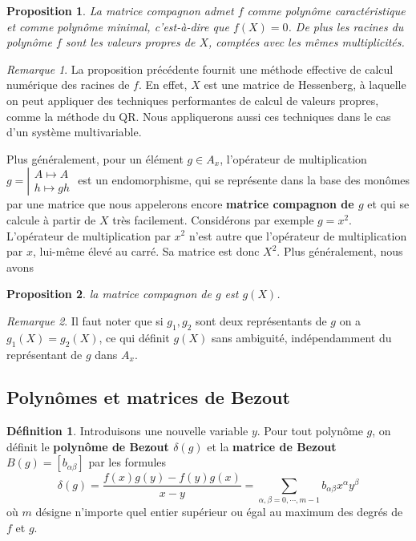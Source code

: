 \documentclass{article}
\theoremstyle{plain}%
\newtheorem{prop}{Proposition}
\theoremstyle{definition}
\newtheorem{defn}{Définition}
\theoremstyle{remark}
\newtheorem*{rem}{Remarque}
\begin{document}
\begin{prop}
\label{compan2roots}
La matrice compagnon admet $f$ comme polynôme caractéristique et comme polynôme minimal, c'est-à-dire que $f(X) = 0$. De plus les racines du polynôme $f$ sont les valeurs propres de $X$, comptées avec les mêmes multiplicités.
\end{prop}

\begin{rem}
La proposition précédente fournit une méthode effective de calcul numérique des racines de $f$. En effet, $X$ est une matrice de Hessenberg, à laquelle on peut appliquer des techniques performantes de calcul de valeurs propres, comme la méthode du QR. Nous appliquerons aussi ces techniques dans le cas d'un système multivariable.
\end{rem}
Plus généralement, pour un élément $g\in A_x$, l'opérateur de multiplication
$g = \left\vert
\begin{array}{c}
A \mapsto A \\
h \mapsto gh
\end{array} 
\right.$
est un endomorphisme, qui se représente dans la base des monômes par une matrice que nous appelerons encore {\bf matrice compagnon de $g$} et qui se calcule à partir de $X$ très facilement. Considérons par exemple $g = x^2$. L'opérateur de multiplication par $x^2$ n'est autre que l'opérateur de multiplication par $x$, lui-même élevé au carré. Sa matrice est donc $X^2$. Plus généralement, nous avons  
\begin{prop}
la matrice compagnon de $g$ est $g(X)$.
\end{prop}

\begin{rem}
Il faut noter que si $g_1, g_2$ sont deux représentants de $g$ on a $g_1(X) = g_2(X)$, ce qui définit $g(X)$ sans ambiguité, indépendamment du représentant de $g$ dans $A_x$.
\end{rem}

\subsection{Polynômes et matrices de Bezout}
\begin{defn}
\label{def_bez}
Introduisons une nouvelle variable $y$.
Pour tout polynôme $g$, on définit le {\bf polynôme de Bezout $\delta(g)$} et la {\bf matrice de Bezout $B(g) = [b_{\alpha\beta}]$}  par les formules
\begin{equation}
\delta(g) = \dfrac{f(x)g(y)-f(y)g(x)}{x-y} = \sum_{\alpha,\beta = 0, \cdots, m-1} b_{\alpha\beta} x^\alpha y^\beta
\end{equation}
où $m$ désigne n'importe quel entier supérieur ou égal au maximum des degrés de $f$ et $g$.
\end{defn}
\end{document}
